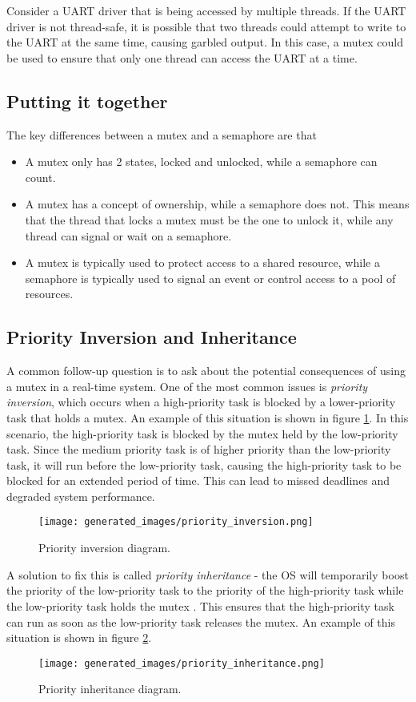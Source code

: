 \documentclass[main.tex]{subfiles}
\begin{document}
\noindent Consider a UART driver that is being accessed by multiple threads. If the UART driver is not thread-safe, it is possible that two threads could attempt to write to the UART at the same time, causing garbled output. In this case, a mutex could be used to ensure that only one thread can access the UART at a time.

\subsection{Putting it together}
The key differences between a mutex and a semaphore are that
\begin{itemize}
    \item A mutex only has 2 states, locked and unlocked, while a semaphore can count.
    \item A mutex has a concept of ownership, while a semaphore does not. This means that the thread that locks a mutex must be the one to unlock it, while any thread can signal or wait on a semaphore.
    \item A mutex is typically used to protect access to a shared resource, while a semaphore is typically used to signal an event or control access to a pool of resources.
\end{itemize}

\subsection{Priority Inversion and Inheritance}
A common follow-up question is to ask about the potential consequences of using a mutex in a real-time system. One of the most common issues is \textit{priority inversion}, which occurs when a high-priority task is blocked by a lower-priority task that holds a mutex. An example of this situation is shown in figure \ref{fig:priority_inversion}. In this scenario, the high-priority task is blocked by the mutex held by the low-priority task. Since the medium priority task is of higher priority than the low-priority task, it will run before the low-priority task, causing the high-priority task to be blocked for an extended period of time. This can lead to missed deadlines and degraded system performance.

\begin{figure}[H]
    \centering
    \texttt{[image: generated\_images/priority\_inversion.png]}
    \caption{Priority inversion diagram.}
    \label{fig:priority_inversion}
\end{figure}

A solution to fix this is called \textit{priority inheritance} - the OS will temporarily boost the priority of the low-priority task to the priority of the high-priority task while the low-priority task holds the mutex \cite{digikey_priority_inversion}. This ensures that the high-priority task can run as soon as the low-priority task releases the mutex. An example of this situation is shown in figure \ref{fig:priority_inheritance}.

\begin{figure}[H]
    \centering
    \texttt{[image: generated\_images/priority\_inheritance.png]}
    \caption{Priority inheritance diagram.}
    \label{fig:priority_inheritance}
\end{figure}
\end{document}
